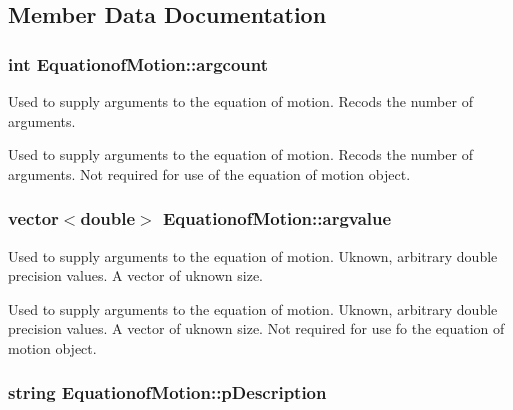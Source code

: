 \subsection{Member Data Documentation}
\hypertarget{class_equationof_motion_ae3a0a566510eaabba1b78c9cad819153}{
\subsubsection[{argcount}]{\setlength{\rightskip}{0pt plus 5cm}int Equationof\-Motion\-::argcount\hspace{0.3cm}{\ttfamily [protected]}}}\label{class_equationof_motion_ae3a0a566510eaabba1b78c9cad819153}


Used to supply arguments to the equation of motion. Recods the number of arguments. 

Used to supply arguments to the equation of motion. Recods the number of arguments. Not required for use of the equation of motion object. \hypertarget{class_equationof_motion_a5a5b52c663f6f4970d4c99451b8b6bbb}{
\subsubsection[{argvalue}]{\setlength{\rightskip}{0pt plus 5cm}vector$<$double$>$ Equationof\-Motion\-::argvalue\hspace{0.3cm}{\ttfamily [protected]}}}\label{class_equationof_motion_a5a5b52c663f6f4970d4c99451b8b6bbb}


Used to supply arguments to the equation of motion. Uknown, arbitrary double precision values. A vector of uknown size. 

Used to supply arguments to the equation of motion. Uknown, arbitrary double precision values. A vector of uknown size. Not required for use fo the equation of motion object. \hypertarget{class_equationof_motion_a042a6741c1b526dcb40348dd89a6c5d5}{
\subsubsection[{p\-Description}]{\setlength{\rightskip}{0pt plus 5cm}string Equationof\-Motion\-::p\-Description\hspace{0.3cm}{\ttfamily [protected]}}}\label{class_equationof_motion_a042a6741c1b526dcb40348dd89a6c5d5}


